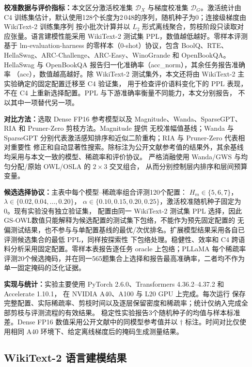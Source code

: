 \documentclass[UTF8,fontset=fandol]{ctexart}
\newcommand{\method}{GS-OWL}
\begin{document}
\textbf{校准数据与评价指标：}本文区分激活校准集 $\mathcal D_X$ 与梯度校准集 $\mathcal D_G$。激活统计由
C4\cite{c4} 训练集估计，默认使用128个长度为2\,048的序列，随机种子为0；连接级梯度由 WikiText-2 训练集序列
按小批次计算并以 $L_2$ 形式离线聚合，剪枝阶段只读取对应张量。语言建模性能采用
WikiText-2\cite{wikitext} 测试集 PPL，数值越低越好。零样本评测基于 lm-evaluation-harness 的零样本（0-shot）协议，包含
BoolQ\cite{boolq}、RTE\cite{glue}、HellaSwag\cite{hellaswag}、ARC-Challenge、ARC-Easy\cite{arc}、WinoGrande\cite{winogrande}
和 OpenBookQA\cite{openbookqa}。HellaSwag 与 OpenBookQA 报告归一化准确率（acc\_norm），其余任务报告准确率
（acc），数值越高越好。除 WikiText-2 测试集外，本文还将由 WikiText-2 主实验确定的固定配置迁移至 C4 验证集，
用于检查评价语料变化下的 PPL 表现，不在 C4 上重新选择配置。PPL 与下游准确率衡量不同能力，本文分别报告，
不以其中一项替代另一项。

\textbf{对比方法：}选取 Dense FP16 参考模型以及 Magnitude、Wanda、SparseGPT、RIA 和 Pruner-Zero 剪枝方法。Magnitude 提供
无校准幅值基线；Wanda 与 SparseGPT 分别代表激活感知排序和近似二阶重构；RIA 与 Pruner-Zero 代表相对重要性
修正和自动显著性搜索。除标注为公开文献参考值的结果外，其余基线均采用与本文一致的模型、稀疏率和评价协议。
严格消融使用 Wanda/GWS 与均匀分配/原始 OWL/OSLA 的 $2\times3$ 交叉组合，
从而分别控制层内排序和层间预算变量。

\textbf{候选选择协议：}主表中每个模型--稀疏率组合评测120个配置：
$H_m\in\{5,6,7\}$，$\lambda\in\{0.02,0.04,\ldots,0.20\}$，
$\alpha\in\{0.10,0.15,0.20,0.25\}$，激活校准随机种子固定为0。现有实验没有独立验证集，
配置由同一 WikiText-2 测试集 PPL 选择，因此 \method 数值只能解释为候选配置的测试集下包络，不能作为预先固定配置的
无偏测试结果，也不参与与单配置基线的最优/次优排名。扩展模型结果采用各自已评测候选集合的最低 PPL，同样按探索性
下包络处理。稳健性、效率和 C4 跨语料分析采用固定配置。零样本表报告逐任务 oracle 上包络；PLLaMA 每个稀疏率
评测20个候选掩码，并在同一565题集合上选择和报告最高准确率，二者均不作为单一固定掩码的泛化证据。

\textbf{实现与统计：}实验主要使用 PyTorch 2.6.0、Transformers 4.36.2--4.37.2 和 Accelerate 1.10.1，
在 NVIDIA A40、A100 与 L20 GPU 上完成。每次运行
保存完整配置、实际稀疏率、剪枝时间以及逐层保留密度和稀疏率；统计仅纳入完成全部剪枝与评测流程的有效结果。
稳定性实验报告3个随机种子的均值与样本标准差。Dense FP16 数值采用公开文献中的同模型参考值并以
$\dagger$ 标注。时间对比仅使用相同 A40 环境下、给定离线梯度后的掩码生成测量结果。

\subsection{WikiText-2 语言建模结果}
\end{document}

